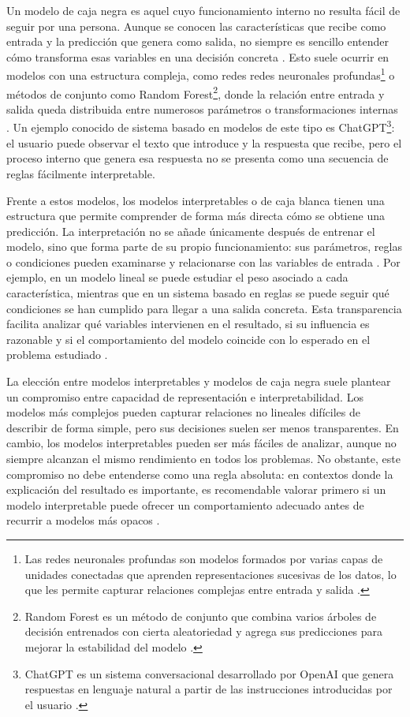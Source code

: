 Un modelo de caja negra es aquel cuyo funcionamiento interno no resulta fácil de seguir por una persona. Aunque se conocen las características que recibe como entrada y la predicción que genera como salida, no siempre es sencillo entender cómo transforma esas variables en una decisión concreta \cite{molnar2022interpretable}. Esto suele ocurrir en modelos con una estructura compleja, como redes redes neuronales profundas\footnote{Las redes neuronales profundas son modelos formados por varias capas de unidades conectadas que aprenden representaciones sucesivas de los datos, lo que les permite capturar relaciones complejas entre entrada y salida \cite{goodfellow2016deep}.} o métodos de conjunto como Random Forest\footnote{Random Forest es un método de conjunto que combina varios árboles de decisión entrenados con cierta aleatoriedad y agrega sus predicciones para mejorar la estabilidad del modelo \cite{breiman2001randomforests}.}, donde la relación entre entrada y salida queda distribuida entre numerosos parámetros o transformaciones internas \cite{molnar2022interpretable}. Un ejemplo conocido de sistema basado en modelos de este tipo es ChatGPT\footnote{ChatGPT es un sistema conversacional desarrollado por OpenAI que genera respuestas en lenguaje natural a partir de las instrucciones introducidas por el usuario \cite{openai2026chatgpt}.}: el usuario puede observar el texto que introduce y la respuesta que recibe, pero el proceso interno que genera esa respuesta no se presenta como una secuencia de reglas fácilmente interpretable.


Frente a estos modelos, los modelos interpretables o de caja blanca tienen una estructura que permite comprender de forma más directa cómo se obtiene una predicción. La interpretación no se añade únicamente después de entrenar el modelo, sino que forma parte de su propio funcionamiento: sus parámetros, reglas o condiciones pueden examinarse y relacionarse con las variables de entrada \cite{molnar2022interpretable}. Por ejemplo, en un modelo lineal se puede estudiar el peso asociado a cada característica, mientras que en un sistema basado en reglas se puede seguir qué condiciones se han cumplido para llegar a una salida concreta. Esta transparencia facilita analizar qué variables intervienen en el resultado, si su influencia es razonable y si el comportamiento del modelo coincide con lo esperado en el problema estudiado \cite{molnar2022interpretable}.

La elección entre modelos interpretables y modelos de caja negra suele plantear un compromiso entre capacidad de representación e interpretabilidad. Los modelos más complejos pueden capturar relaciones no lineales difíciles de describir de forma simple, pero sus decisiones suelen ser menos transparentes. En cambio, los modelos interpretables pueden ser más fáciles de analizar, aunque no siempre alcanzan el mismo rendimiento en todos los problemas. No obstante, este compromiso no debe entenderse como una regla absoluta: en contextos donde la explicación del resultado es importante, es recomendable valorar primero si un modelo interpretable puede ofrecer un comportamiento adecuado antes de recurrir a modelos más opacos \cite{rudin2019interpretable}.

